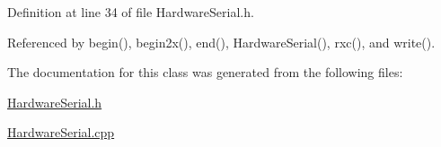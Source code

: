 Definition at line 34 of file HardwareSerial.h.



Referenced by begin(), begin2x(), end(), HardwareSerial(), rxc(), and write().



The documentation for this class was generated from the following files:\begin{DoxyCompactItemize}
\item 
\hyperlink{_hardware_serial_8h}{HardwareSerial.h}\item 
\hyperlink{_hardware_serial_8cpp}{HardwareSerial.cpp}\end{DoxyCompactItemize}

